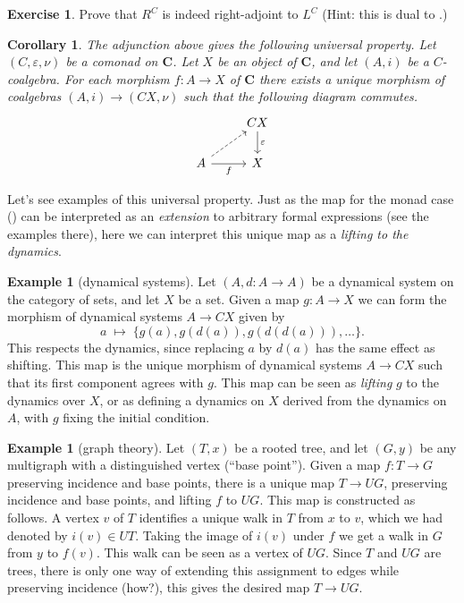 \documentclass[12pt,oneside]{scrbook}
\numberwithin{equation}{section}
\theoremstyle{plain}
\newtheorem{cor}[thm]{Corollary}
\theoremstyle{definition}
\newtheorem{eg}[thm]{Example}
\newtheorem{ex}[thm]{Exercise}
\newcommand{\cat}[1]{{\mathbf{#1}}} %
\newcommand{\ar}[2][]{\arrow{#2}{#1}}
\newcommand{\uni}[2][]{\arrow[dashrightarrow]{#2}{#1}} %
\newcommand{\e}{\varepsilon}
\DeclareMathOperator{\1}{\mathbbm{1}}
\DeclareMathOperator{\2}{\mathbbm{2}}
\begin{document}
\begin{ex}
 Prove that $R^C$ is indeed right-adjoint to $L^C$ (Hint: this is dual to .)
\end{ex}

\begin{cor}
 The adjunction above gives the following universal property. Let $(C,\e,\nu)$ be a comonad on $\cat{C}$. Let $X$ be an object of $\cat{C}$, and let $(A,i)$ be a $C$-coalgebra. For each morphism $f:A\to X$ of $\cat{C}$ there exists a unique morphism of coalgebras $(A,i)\to (CX,\nu)$ such that the following diagram commutes.
 $$
 \begin{tikzcd}
 & CX \ar{d}{\e} \\
 A \uni{ur} \ar{r}[swap]{f} & X
 \end{tikzcd}
 $$
\end{cor}

Let's see examples of this universal property. Just as the map for the monad case () can be interpreted as an \emph{extension} to arbitrary formal expressions (see the examples there), here we can interpret this unique map as a \emph{lifting to the dynamics}.

\begin{eg}[dynamical systems]
 Let $(A,d:A\to A)$ be a dynamical system on the category of sets, and let $X$ be a set. Given a map $g:A\to X$ we can form the morphism of dynamical systems $A\to CX$ given by 
 $$
 a\;\longmapsto\; \{g(a), g(d(a)), g(d(d(a))),\dots\} .
 $$
 This respects the dynamics, since replacing $a$ by $d(a)$ has the same effect as shifting. This map is the unique morphism of dynamical systems $A\to CX$ such that its first component agrees with $g$. This map can be seen as \emph{lifting} $g$ to the dynamics over $X$, or as defining a dynamics on $X$ derived from the dynamics on $A$, with $g$ fixing the initial condition.
\end{eg}

\begin{eg}[graph theory]
 Let $(T,x)$ be a rooted tree, and let $(G,y)$ be any multigraph with a distinguished vertex (``base point''). Given a map $f:T\to G$ preserving incidence and base points, there is a unique map $T\to UG$, preserving incidence and base points, and lifting $f$ to $UG$. This map is constructed as follows. A vertex $v$ of $T$ identifies a unique walk in $T$ from $x$ to $v$, which we had denoted by $i(v)\in UT$. Taking the image of $i(v)$ under $f$ we get a walk in $G$ from $y$ to $f(v)$. This walk can be seen as a vertex of $UG$. Since $T$ and $UG$ are trees, there is only one way of extending this assignment to edges while preserving incidence (how?), this gives the desired map $T\to UG$. 
\end{eg}
\end{document}
